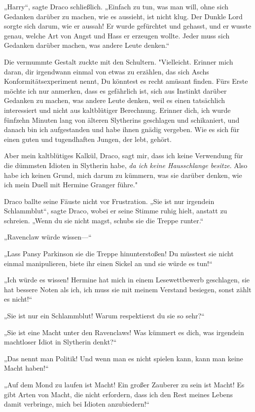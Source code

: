 {„Harry“, sagte Draco schließlich. „Einfach zu tun, was man will, ohne sich Gedanken darüber zu machen, wie es aussieht, ist nicht klug. Der Dunkle Lord sorgte sich darum, wie er aussah! Er wurde gefürchtet und gehasst, und er wusste genau, welche Art von Angst und Hass er erzeugen wollte. Jeder muss sich Gedanken darüber machen, was andere Leute denken.“

Die vermummte Gestalt zuckte mit den Schultern. "Vielleicht. Erinner mich daran, dir irgendwann einmal von etwas zu erzählen, das sich Aschs Konformitätsexperiment nennt, Du könntest es recht amüsant finden. Fürs Erste möchte ich nur anmerken, dass es gefährlich ist, sich aus Instinkt darüber Gedanken zu machen, was andere Leute denken, weil es einen tatsächlich interessiert und nicht aus kaltblütiger Berechnung. Erinner dich, ich wurde fünfzehn Minuten lang von älteren Slytherins geschlagen und schikaniert, und danach bin ich aufgestanden und habe ihnen gnädig vergeben. Wie es sich für einen guten und tugendhaften Jungen, der lebt, gehört.

Aber mein kaltblütiges Kalkül, Draco, sagt mir, dass ich keine Verwendung für die dümmsten Idioten in Slytherin habe, \emph{da ich keine Hausschlange besitze}. Also habe ich keinen Grund, mich darum zu kümmern, was sie darüber denken, wie ich mein Duell mit Hermine Granger führe."

Draco ballte seine Fäuste nicht vor Frustration. „Sie ist nur irgendein Schlammblut“, sagte Draco, wobei er seine Stimme ruhig hielt, anstatt zu schreien. „Wenn du sie nicht magst, schubs sie die Treppe runter.“

„Ravenclaw würde wissen—“

„Lass Pansy Parkinson sie die Treppe hinunterstoßen! Du müsstest sie nicht einmal manipulieren, biete ihr einen Sickel an und sie würde es tun!“

„Ich würde es wissen! Hermine hat mich in einem Lesewettbewerb geschlagen, sie hat bessere Noten als ich, ich muss sie mit meinem Verstand besiegen, sonst zählt es nicht!“

„Sie ist nur ein Schlammblut! Warum respektierst du sie so sehr?“

„Sie ist eine Macht unter den Ravenclaws! Was kümmert es dich, was irgendein machtloser Idiot in Slytherin denkt?“

„Das nennt man Politik! Und wenn man es nicht spielen kann, kann man keine Macht haben!“

„Auf dem Mond zu laufen ist Macht! Ein großer Zauberer zu sein ist Macht! Es gibt Arten von Macht, die nicht erfordern, dass ich den Rest meines Lebens damit verbringe, mich bei Idioten anzubiedern!“

}
